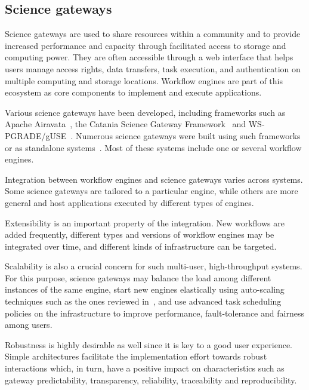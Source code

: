 \documentclass[preprint,3p,twocolumn]{elsarticle}
\begin{document}
\subsection{Science gateways}

\label{sec:intro_sg}

Science gateways are used to share resources within a community and to
provide increased performance and capacity through facilitated access
to storage and computing power. They are often accessible through a
web interface that helps users manage access rights, data transfers,
task execution, and authentication on multiple computing and storage
locations. Workflow engines are part of this ecosystem as core
components to implement and execute
applications. 

Various science gateways have been developed, including frameworks
such as Apache Airavata~\cite{marru2011apache}, the Catania Science
Gateway Framework~\cite{ardizzone2012decide} and
WS-PGRADE/gUSE~\cite{Kacsuk2012}. Numerous science gateways were built
using such frameworks~\cite{kacsuk2014science,ardizzone2012decide} or
as standalone systems~\cite{SHER-14,GLAT-13}. Most of these systems
include one or several workflow engines.


Integration between workflow engines and science gateways varies
across systems. Some science gateways are tailored to a particular
engine, while others are more general and host applications
executed by different types of engines. %

Extensibility is an important property of the integration. New
workflows are added frequently, different types and versions of
workflow engines may be integrated over time, and different kinds of
infrastructure can be targeted. 

Scalability is also a crucial concern for such multi-user,
high-throughput systems. For this purpose, science gateways may
balance the load among different instances of the same engine, start
new engines elastically using auto-scaling techniques such as the ones
reviewed in~\cite{lorido2012auto}, and use advanced task scheduling
policies on the infrastructure to improve performance, fault-tolerance
and fairness among users.

Robustness is highly desirable as well since it is key to a
good user experience. Simple architectures facilitate the
implementation effort towards robust interactions which, in turn, have
a positive impact on characteristics such as gateway predictability,
transparency, reliability, traceability and
reproducibility. 
\end{document}
